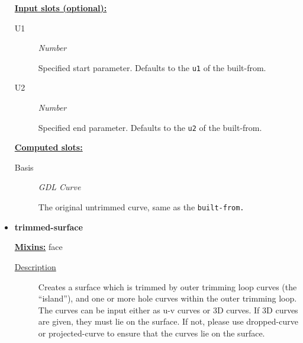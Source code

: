 \documentclass [11pt]{book}
\begin{document}
\begin{itemize}
\textbf{
\underline{Input slots (optional):}}

\begin{description}

\item [U1]
\emph{Number}

 Specified start parameter. Defaults to the \texttt{u1} of the built-from.




\item [U2]
\emph{Number}

 Specified end parameter. Defaults to the \texttt{u2} of the built-from.




\end{description}






\textbf{
\underline{Computed slots:}}

\begin{description}

\item [Basis]
\emph{GDL Curve}

 The original untrimmed curve, same as the \texttt{built-from.}




\end{description}







\item {}
\label{prim:trimmed-surface}
\textbf{trimmed-surface}


\textbf{
\underline{Mixins:}} face





\begin{description}

\item [
\underline{Description}]


Creates a surface which is trimmed by outer trimming loop curves (the ``island''), and one or more 
hole curves within the outer trimming loop. The curves can be input either as u-v curves or 3D curves.
If 3D curves are given, they must lie on the surface. If not, please use dropped-curve or projected-curve
to ensure that the curves lie on the surface.





\end{description}
\end{itemize}
\end{document}
